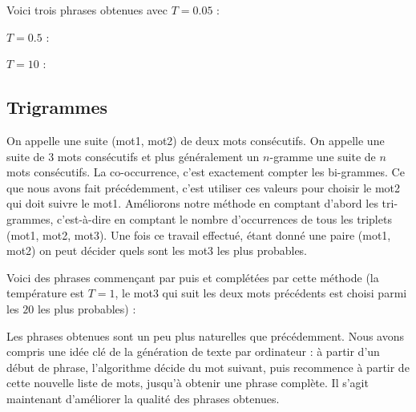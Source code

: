 \documentclass[11pt,class=report,crop=false]{standalone}
\begin{document}
Voici trois phrases obtenues avec $T=0.05$ :


$T=0.5$ :



$T = 10$ :



\subsection{Trigrammes}

On appelle  une suite (mot1, mot2) de deux mots consécutifs.
On appelle  une suite de $3$ mots consécutifs et plus généralement un $n$-gramme une suite de $n$ mots consécutifs.
La co-occurrence, c'est exactement compter les bi-grammes. Ce que nous avons fait précédemment, c'est utiliser ces valeurs pour choisir le mot2 qui doit suivre le mot1.
Améliorons notre méthode en comptant d'abord les tri-grammes, c'est-à-dire en comptant le nombre d'occurrences de tous les triplets (mot1, mot2, mot3).
Une fois ce travail effectué, étant donné une paire (mot1, mot2) on peut décider quels sont les mot3 les plus probables.

Voici des phrases commençant par  puis  et complétées par cette méthode (la température est $T=1$, le mot3 qui suit les deux mots précédents est choisi parmi les $20$ les plus probables) :

Les phrases obtenues sont un peu plus naturelles que précédemment.
Nous avons compris une idée clé de la génération de texte par ordinateur : à partir d'un début de phrase, l'algorithme décide du mot suivant, puis recommence à partir de cette nouvelle liste de mots, jusqu'à obtenir une phrase complète.
Il s'agit maintenant d'améliorer la qualité des phrases obtenues.
\end{document}
